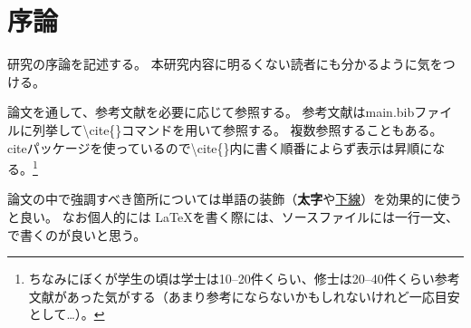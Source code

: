 \chapter{序論}\label{ch:introduction}

研究の序論を記述する。
本研究内容に明るくない読者にも分かるように気をつける。

論文を通して、参考文献を必要に応じて参照する\cite{bar:great2020coolname}。
参考文献はmain.bibファイルに列挙して{\textbackslash}cite\{\}コマンドを用いて参照する。
複数参照することもある\cite{bar:great2020coolname,garply:happy2021anothercoolname}。
citeパッケージを使っているので{\textbackslash}cite\{\}内に書く順番によらず表示は昇順になる\cite{garply:happy2021anothercoolname,bar:great2020coolname}。\footnote{ちなみにぼくが学生の頃は学士は10--20件くらい、修士は20--40件くらい参考文献があった気がする（あまり参考にならないかもしれないけれど一応目安として…）。}

論文の中で強調すべき箇所については単語の装飾（\textbf{太字}や\underline{下線}）を効果的に使うと良い。
なお個人的には \LaTeX を書く際には、ソースファイルには一行一文、で書くのが良いと思う。
